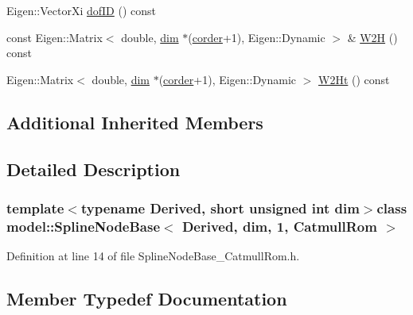 \begin{DoxyCompactItemize}
\item 
Eigen\+::\+Vector\+Xi \hyperlink{classmodel_1_1_spline_node_base_3_01_derived_00_01dim_00_011_00_01_catmull_rom_01_4_a3ee75e74a1912e423c857dbe28ef6f8b}{dof\+I\+D} () const 
\item 
const Eigen\+::\+Matrix$<$ double, \hyperlink{plot_nd_a_8m_a382f3ca768b275b8d563604f7fc7df73}{dim} $\ast$(\hyperlink{classmodel_1_1_spline_node_base_3_01_derived_00_01dim_00_011_00_01_catmull_rom_01_4_ab13da9c673efb528b32f27cce59e9b90af0273aaa3354d1dcfbfb6c727a3379b3}{corder}+1), Eigen\+::\+Dynamic $>$ \& \hyperlink{classmodel_1_1_spline_node_base_3_01_derived_00_01dim_00_011_00_01_catmull_rom_01_4_aecfc64093b20d11eed1a6e197e4d4c06}{W2\+H} () const 
\item 
Eigen\+::\+Matrix$<$ double, \hyperlink{plot_nd_a_8m_a382f3ca768b275b8d563604f7fc7df73}{dim} $\ast$(\hyperlink{classmodel_1_1_spline_node_base_3_01_derived_00_01dim_00_011_00_01_catmull_rom_01_4_ab13da9c673efb528b32f27cce59e9b90af0273aaa3354d1dcfbfb6c727a3379b3}{corder}+1), Eigen\+::\+Dynamic $>$ \hyperlink{classmodel_1_1_spline_node_base_3_01_derived_00_01dim_00_011_00_01_catmull_rom_01_4_ad13f4c509c1defd78a6491baeae80775}{W2\+Ht} () const 
\end{DoxyCompactItemize}
\subsection*{Additional Inherited Members}


\subsection{Detailed Description}
\subsubsection*{template$<$typename Derived, short unsigned int dim$>$class model\+::\+Spline\+Node\+Base$<$ Derived, dim, 1, Catmull\+Rom $>$}



Definition at line 14 of file Spline\+Node\+Base\+\_\+\+Catmull\+Rom.\+h.



\subsection{Member Typedef Documentation}
\hypertarget{classmodel_1_1_spline_node_base_3_01_derived_00_01dim_00_011_00_01_catmull_rom_01_4_a62122ec7698f5b118c3d268097401fee}{}
